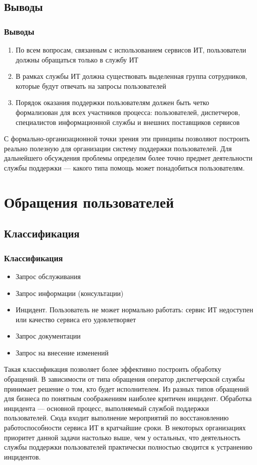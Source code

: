 \documentclass{../industrial-development}
\begin{document}
\subsection{Выводы}
\begin{frame} \frametitle{Выводы}
\begin{enumerate}  
		\item По всем вопросам, связанным с использованием сервисов ИТ, пользователи должны обращаться только в службу ИТ 
		\item  В рамках службы ИТ должна существовать выделенная группа сотрудников, которые будут отвечать на запросы пользователей 
		\item Порядок оказания поддержки пользователям должен быть четко формализован для всех участников процесса: пользователей, диспетчеров, специалистов информационной службы и внешних поставщиков сервисов 
\end{enumerate}  
\end{frame}

\lecturenotes
С формально-организационной точки зрения эти принципы позволяют построить реально полезную для организации систему поддержки пользователей. Для дальнейшего обсуждения проблемы определим более точно предмет деятельности службы поддержки — какого типа помощь может понадобиться пользователям. 

\section{Обращения пользователей}
\subsection{Классификация}
\begin{frame} \frametitle{Классификация}
	\begin{itemize} 
		\item Запрос обслуживания
		\item Запрос информации (консультации)
		\item Инцидент. Пользователь не может нормально работать: сервис ИТ недоступен или качество сервиса его удовлетворяет
		\item Запрос документации
		\item Запрос на внесение изменений 
	\end{itemize}
\end{frame}

\lecturenotes
Такая классификация позволяет более эффективно построить обработку обращений. В зависимости от типа обращения оператор диспетчерской службы принимает решение о том, кто будет исполнителем. Из разных типов обращений для бизнеса по понятным соображениям наиболее критичен инцидент. Обработка инцидента — основной процесс, выполняемый службой поддержки пользователей. Сюда входит выполнение мероприятий по восстановлению работоспособности сервиса ИТ в кратчайшие сроки. В некоторых организациях приоритет данной задачи настолько выше, чем у остальных, что деятельность службы поддержки пользователей практически полностью сводится к устранению инцидентов. 
\end{document}

